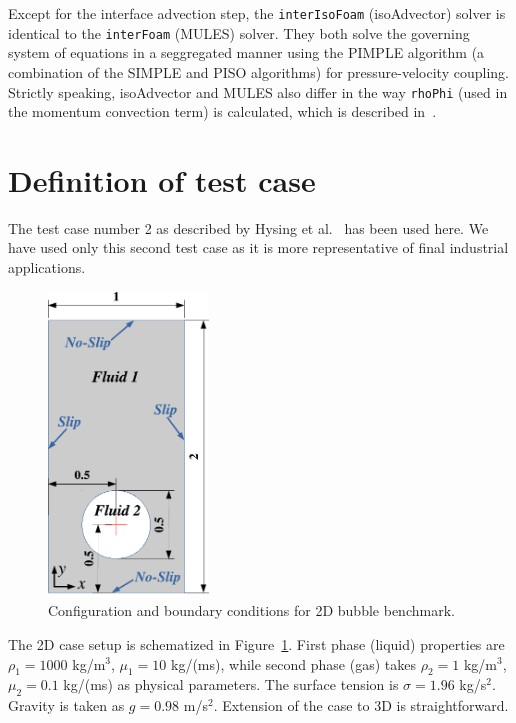 \documentclass[review]{elsarticle}
\begin{document}
Except for the interface advection step, the \verb+interIsoFoam+ (isoAdvector) solver is identical to the \verb+interFoam+ (MULES) solver. They both solve the governing system of equations in a seggregated manner using the PIMPLE algorithm (a combination of the SIMPLE and PISO algorithms) for pressure-velocity coupling. 
Strictly speaking, isoAdvector and MULES also differ in the way \verb+rhoPhi+ (used in the momentum convection term) is calculated, which is described in~\cite{roenby_isoadvector:_2018}.

\section{Definition of test case}\label{sec_testcasedef}
The test case number 2 as described by Hysing et al.~\cite{Hysing2009} has been used here. 
We have used only this second test case as it is more representative of final industrial
applications. 
\begin{figure}[!h]
\begin{center}
 \vspace{-5mm}
 \includegraphics[width=4.25cm]{figures/benchmark_scheme.pdf}
 \vspace{-3mm}
\end{center}
\caption{Configuration and boundary conditions for 2D bubble benchmark.}
\label{fig:1}
\end{figure}
The 2D case setup is schematized in Figure~\ref{fig:1}. First phase (liquid) properties are 
$\rho_1=1000$ kg/m$^3$, $\mu_1=10$ kg/(ms), while second phase (gas) takes $\rho_2=1$ kg/m$^3$, $\mu_2=0.1$ kg/(ms) as physical parameters. 
The surface tension is $\sigma=1.96$ kg/s$^2$. Gravity is taken as $g=0.98$ m/s$^2$. Extension of the case to 3D is straightforward.
\end{document}
